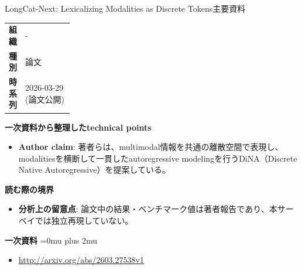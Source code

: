\begin{technicalnote}{LongCat-Next: Lexicalizing Modalities as Discrete Tokens}{主要資料}
\begingroup
\begin{tabularx}{\linewidth}{@{}>{\bfseries}p{0.22\linewidth}X@{}}
組織 & - \\
種別 & 論文 \\
時系列 & 2026-03-29 (論文公開) \\
\end{tabularx}
\smallskip
{\bfseries 一次資料から整理したtechnical points}
\begin{itemize}[leftmargin=1.5em,itemsep=0.35em]
\item \textbf{Author claim}: 著者らは、multimodal情報を共通の離散空間で表現し、modalitiesを横断して一貫したautoregressive modelingを行うDiNA（Discrete Native Autoregressive）を提案している。
\end{itemize}
\begin{minipage}{\linewidth}
{\bfseries 読む際の境界}
\begin{itemize}[leftmargin=1.5em,itemsep=0.35em]
\item \textbf{分析上の留意点}: 論文中の結果・ベンチマーク値は著者報告であり、本サーベイでは独立再現していない。
\end{itemize}
\begin{samepage}
{\bfseries 一次資料}
\begingroup\sloppy
\Urlmuskip=0mu plus 2mu\relax
\begin{itemize}[leftmargin=1.5em,itemsep=0.25em]
\item {\scriptsize\url{http://arxiv.org/abs/2603.27538v1}}
\end{itemize}
\endgroup
\end{samepage}
\end{minipage}
\endgroup
\end{technicalnote}
\medskip

